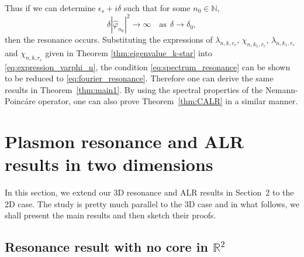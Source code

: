 \documentclass[11pt,reqno,twoside]{amsart}
\theoremstyle{definition}
\theoremstyle{remark}
\numberwithin{equation}{section}
\begin{document}
Thus if we can determine $\epsilon_s+i\delta$ such that for some $n_0\in\mathbb{N}$,
\begin{equation}\label{eq:spectrum_resonance}
  \delta |\hat{\varphi}_{n_0}|^2\rightarrow\infty\quad\mbox{as}\ \ \delta\rightarrow\delta_0, 
\end{equation}
then the resonance occurs. Substituting the expressions of $\lambda_{n,k,r_e}$, $\chi_{n,k_1,r_e}$, $\lambda_{n,k_1,r_e}$ and $\chi_{n,k,r_e}$ given in Theorem \ref{thm:eigenvalue_k-star} into \eqref{eq:expression_varphi_n}, the condition \eqref{eq:spectrum_resonance} can be shown to be reduced to \eqref{eq:fourier_resonance}. Therefore one can derive the same results in Theorem~\ref{thm:main1}. By using the spectral properties of the Nemann-Poinc\'are operator, one can also prove Theorem~\ref{thm:CALR} in a similar manner.

\section{Plasmon resonance and ALR results in two dimensions}

In this section, we extend our 3D resonance and ALR results in Section~2 to the 2D case. The study is pretty much parallel to the 3D case and in what follows, we shall present the main results and then sketch their proofs. 

\subsection{Resonance result with no core in $\mathbb{R}^2$}
\end{document}
